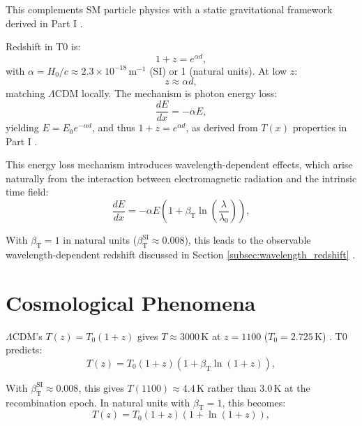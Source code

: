 \documentclass[12pt,a4paper]{article}
\newcommand{\Tfield}{T(x)}
\newcommand{\betaT}{\beta_{\text{T}}}
\newcommand{\LCDM}{\Lambda\text{CDM}}
\begin{document}
	This complements SM particle physics with a static gravitational framework derived in Part I \cite{pascher_part1_2025}.
	
	Redshift in T0 is:
	\begin{equation}
		1 + z = e^{\alpha d},
		\label{eq:redshift_distance}
	\end{equation}
	with \(\alpha = H_0 / c \approx 2.3 \times 10^{-18} \, \text{m}^{-1}\) (SI) or 1 (natural units). At low \(z\):
	\begin{equation}
		z \approx \alpha d,
		\label{eq:hubble_approx}
	\end{equation}
	matching \(\LCDM\) locally. The mechanism is photon energy loss:
	\begin{equation}
		\frac{dE}{dx} = -\alpha E,
		\label{eq:energy_loss_rate}
	\end{equation}
	yielding \(E = E_0 e^{-\alpha d}\), and thus \(1 + z = e^{\alpha d}\), as derived from \(\Tfield\) properties in Part I \cite{pascher_part1_2025}.
	
	This energy loss mechanism introduces wavelength-dependent effects, which arise naturally from the interaction between electromagnetic radiation and the intrinsic time field:
	\begin{equation}
		\frac{dE}{dx} = -\alpha E \left(1 + \betaT \ln\left(\frac{\lambda}{\lambda_0}\right)\right),
		\label{eq:wavelength_energy_loss}
	\end{equation}
	
	With \(\betaT = 1\) in natural units (\(\betaT^{\text{SI}} \approx 0.008\)), this leads to the observable wavelength-dependent redshift discussed in Section \ref{subsec:wavelength_redshift} \cite{pascher_params_2025}.
	
	\section{Cosmological Phenomena}
	\(\LCDM\)'s \(T(z) = T_0 (1 + z)\) gives \(T \approx 3000 \, \text{K}\) at \(z = 1100\) (\(T_0 = 2.725 \, \text{K}\)) \cite{Fixsen2009}. T0 predicts:
	\begin{equation}
		T(z) = T_0 (1 + z) (1 + \betaT \ln(1 + z)),
		\label{eq:temperature_redshift}
	\end{equation}
	
	With \(\betaT^{\text{SI}} \approx 0.008\), this gives \(T(1100) \approx 4.4 \, \text{K}\) rather than \(3.0 \, \text{K}\) at the recombination epoch. In natural units with \(\betaT = 1\), this becomes:
	\begin{equation}
		T(z) = T_0 (1 + z) (1 + \ln(1 + z)),
		\label{eq:temperature_redshift_natural}
	\end{equation}
	
\end{document}
